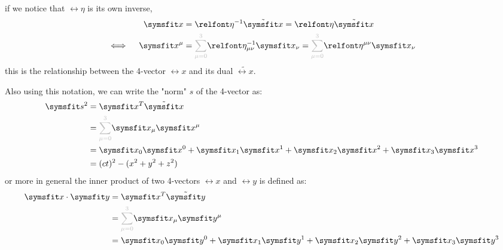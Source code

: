 if we notice that $\rel{\eta}$ is its own inverse,
\begin{align}
  \rel{x}                & = \rel{\eta}^{-1} \tilde{\rel{x}} = \rel{\eta} \tilde{\rel{x}}                                                                                          \\
  \iff \quad \rel{x}^\mu & = \textcolor{gray!50}{\sum_{\mu = 0}^3} \rel{\eta}^{-1}_{\mu \nu} \rel{x}_\nu =  \textcolor{gray!50}{\sum_{\mu = 0}^3} \rel{\eta}^{\mu \nu} \rel{x}_\nu
\end{align}
this is the relationship between the 4-vector $\rel{x}$ and its dual $\tilde{\rel{x}}$.

Also using this notation, we can write the "norm" $s$ of the 4-vector as:
\begin{align}
  \rel{s}^2 & = \rel{x}^T \tilde{\rel{x}}                                                             \\
            & = \textcolor{gray!50}{\sum_{\mu = 0}^3} \rel{x}_\mu \rel{x}^\mu                         \\
            & = \rel{x}_0 \rel{x}^0 + \rel{x}_1 \rel{x}^1 + \rel{x}_2 \rel{x}^2 + \rel{x}_3 \rel{x}^3 \\
            & = (ct)^2 - (x^2 + y^2 + z^2)
\end{align}
or more in general the inner product of two 4-vectors $\rel{x}$ and $\rel{y}$ is defined as:
\begin{align}
  \rel{x} \cdot \rel{y} & = \rel{x}^T \tilde{\rel{y}}                                                             \\
                        & = \textcolor{gray!50}{\sum_{\mu = 0}^3} \rel{x}_\mu \rel{y}^\mu                         \\
                        & = \rel{x}_0 \rel{y}^0 + \rel{x}_1 \rel{y}^1 + \rel{x}_2 \rel{y}^2 + \rel{x}_3 \rel{y}^3
\end{align}

